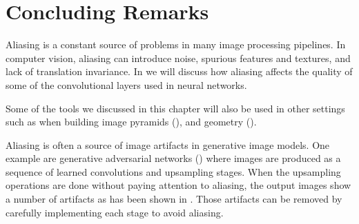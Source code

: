 

\section{Concluding Remarks}

Aliasing is a constant source of problems in many image processing pipelines. In computer vision, aliasing can introduce noise, spurious features and textures, and lack of translation invariance. In \chap{\ref{chapter:convolutional_neural_nets}} we will discuss how aliasing affects the quality of some of the convolutional layers used in neural networks.

Some of the tools we discussed in this chapter will also be used in other settings such as when building image pyramids (\chap{\ref{chapter:image_pyramids}}), and geometry (\chap{\ref{chapter:geometry_homogeneous}}).

Aliasing is often a source of image artifacts in generative image models. One example are generative adversarial networks (\chap{\ref{chapter:generative_models}}) where images are produced as a sequence of learned convolutions and upsampling stages. When the upsampling operations are done without paying attention to aliasing, the output images show a number of artifacts as has been shown in \cite{Karras2021}. Those artifacts can be removed by carefully implementing each stage to avoid aliasing.

